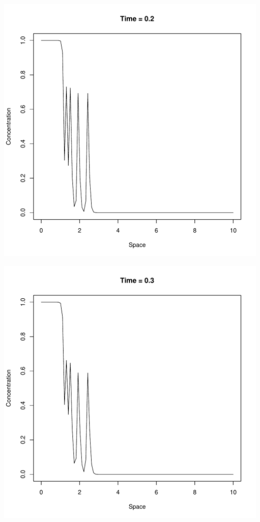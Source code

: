 \documentclass{tufte-handout}\usepackage[]{graphicx}\usepackage[]{xcolor}
\makeatletter
\def\maxwidth{ %
  \ifdim\Gin@nat@width>\linewidth
    \linewidth
  \else
    \Gin@nat@width
  \fi
}
\newenvironment{knitrout}{}{} %
\makeatother
\begin{document}
\begin{knitrout}
\includegraphics[width=\maxwidth]{figure/unnamed-chunk-2-3} 

\includegraphics[width=\maxwidth]{figure/unnamed-chunk-2-4} 


\end{knitrout}
\end{document}
